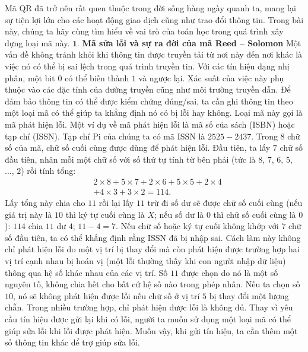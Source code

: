 \begin{multicols}{2}
	Mã QR đã trở nên rất quen thuộc trong đời sống hàng ngày quanh ta, mang lại sự tiện lợi lớn cho các hoạt động giao dịch cũng như trao đổi thông tin. Trong bài này, chúng ta hãy cùng tìm hiểu về vai trò của toán học trong quá trình xây dựng loại mã này.
	\vskip 0.05cm
	$\pmb{1.}$ \textbf{\color{toanhocdoisong}\color{toanhocdoisong}Mã sửa lỗi và sự ra đời của mã Reed -- Solomon}
	\vskip 0.05cm
	Một vấn đề không tránh khỏi khi thông tin được truyền tải từ nơi này đến nơi khác là việc nó có thể bị sai lệch trong quá trình truyền tin. Với các tín hiệu dạng nhị phân, một bit $0$ có thể biến thành $1$ và ngược lại. Xác suất của việc này phụ thuộc vào các đặc tính của đường truyền cũng như môi trường truyền dẫn.
	\vskip 0.05cm
	Để đảm bảo thông tin có thể được kiểm chứng đúng/sai, ta cần ghi thông tin theo một loại mã có thể giúp ta khẳng định nó có bị lỗi hay không. Loại mã này gọi là mã phát hiện lỗi.
	\vskip 0.05cm
	Một ví dụ về mã phát hiện lỗi là mã số của sách (ISBN) hoặc tạp chí (ISSN). Tạp chí Pi của chúng ta có mã ISSN là $2525-2437$. Trong $8$ chữ số của mã, chữ số cuối cùng được dùng để phát hiện lỗi. Đầu tiên, ta lấy $7$ chữ số đầu tiên, nhân mỗi một chữ số với số thứ tự tính từ bên phải (tức là $8$, $7$, $6$, $5$, ..., $2$) rồi tính tổng:
	\setlength{\abovedisplayskip}{4pt}
	\setlength{\belowdisplayskip}{4pt}
	\begin{align*}
		&2\times8+5\times7+2\times6+5\times5+2\times4\\
		&+4\times3+3\times2=114.
	\end{align*}
	Lấy tổng này chia cho $11$ rồi lại lấy $11$ trừ đi số dư sẽ được chữ số cuối cùng (nếu giá trị này là $10$ thì ký tự cuối cùng là $X$; nếu số dư là $0$ thì chữ số cuối cùng là $0$): $114$ chia $11$ dư $4$; $11 - 4 = 7$.
	\vskip 0.05cm
	Nếu chữ số hoặc ký tự cuối không khớp với $7$ chữ số đầu tiên, ta có thể khẳng định rằng ISSN đã bị nhập sai. Cách làm này không chỉ phát hiện lỗi do một vị trí bị thay đổi mà còn phát hiện được trường hợp hai vị trí cạnh nhau bị hoán vị (một lỗi thường thấy khi con người nhập dữ liệu) thông qua hệ số khác nhau của các vị trí. Số $11$ được chọn do nó là một số nguyên tố, không chia hết cho bất cứ hệ số nào trong phép nhân. Nếu ta chọn số $10$, nó sẽ không phát hiện được lỗi nếu chữ số ở vị trí $5$ bị thay đổi một lượng chẵn.
	\vskip 0.05cm
	Trong nhiều trường hợp, chỉ phát hiện được lỗi là không đủ. Thay vì yêu cầu tín hiệu được gửi lại khi có lỗi, người ta muốn sử dụng một loại mã có thể giúp sửa lỗi khi lỗi được phát hiện. Muốn vậy, khi gửi tín hiệu, ta cần thêm một số thông tin khác để trợ giúp sửa lỗi.

\end{multicols}
